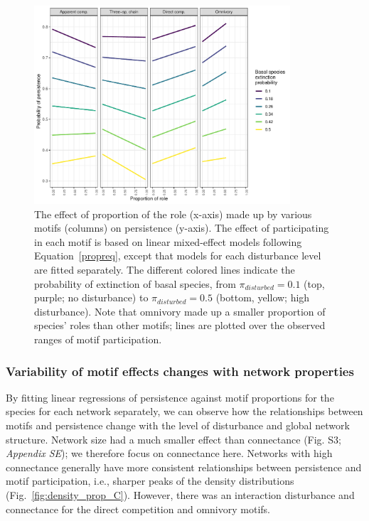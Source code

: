 \documentclass[12pt]{article}
\begin{document}
\begin{spacing}{2.0}
            
            \begin{figure}[h!]
                \centering
                \includegraphics[width=0.85\textwidth]{figures/prop_lmer_allCS.pdf}
                \caption{The effect of proportion of the role (x-axis) made up by various motifs (columns) on persistence (y-axis). The effect of participating in each motif is based on linear mixed-effect models following Equation~\ref{propreq}, except that models for each  disturbance level are fitted separately. The different colored lines indicate the probability of extinction of basal species, from $\pi_{disturbed} = 0.1$ (top, purple; no disturbance) to $\pi_{disturbed} = 0.5$ (bottom, yellow; high disturbance). Note that omnivory made up a smaller proportion of species' roles than other motifs; lines are plotted over the observed ranges of motif participation.}
                \label{fig:prop_lmer_all}
            \end{figure}
        
        \clearpage
    
        \subsubsection*{Variability of motif effects changes with network properties}

            By fitting linear regressions of persistence against motif proportions for the species for each network separately, we can observe how the relationships between motifs and persistence change with the level of disturbance and global network structure. Network size had a much smaller effect than connectance (Fig. S3; \emph{Appendix SE}); we therefore focus on connectance here. 
            Networks with high connectance generally have more consistent relationships between persistence and motif participation, i.e., sharper peaks of the density distributions (Fig.~\ref{fig:density_prop_C}). 
            However, there was an interaction disturbance and connectance for the direct competition and omnivory motifs.
            

\end{spacing}
\end{document}
